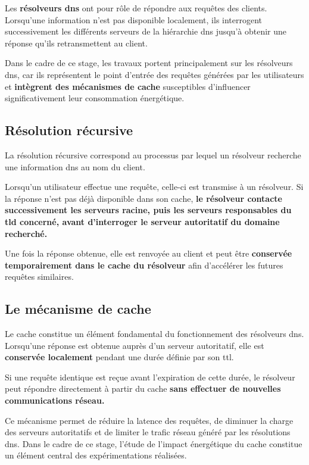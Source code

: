 \documentclass[12pt, a4paper]{report}
\begin{document}
	Les \textbf{résolveurs \gls{dns}} ont pour rôle de répondre aux requêtes des clients. Lorsqu'une information n'est pas disponible localement, ils interrogent successivement les différents serveurs de la hiérarchie \gls{dns} jusqu'à obtenir une réponse qu'ils retransmettent au client.

	Dans le cadre de ce stage, les travaux portent principalement sur les résolveurs \gls{dns}, car ils représentent le point d'entrée des requêtes générées par les utilisateurs et \textbf{intègrent des mécanismes de cache} susceptibles d'influencer significativement leur consommation énergétique.

	\subsection{Résolution récursive}

	La résolution récursive correspond au processus par lequel un résolveur recherche une information \gls{dns} au nom du client.

	Lorsqu'un utilisateur effectue une requête, celle-ci est transmise à un résolveur. Si la réponse n'est pas déjà disponible dans son cache, \textbf{le résolveur contacte successivement les serveurs racine, puis les serveurs responsables du \gls{tld} concerné, avant d'interroger le serveur autoritatif du domaine recherché.}

	Une fois la réponse obtenue, elle est renvoyée au client et peut être \textbf{conservée temporairement dans le cache du résolveur} afin d'accélérer les futures requêtes similaires.

	\subsection{Le mécanisme de cache}

	Le cache constitue un élément fondamental du fonctionnement des résolveurs \gls{dns}. Lorsqu'une réponse est obtenue auprès d'un serveur autoritatif, elle est \textbf{conservée localement} pendant une durée définie par son \gls{ttl}.

	Si une requête identique est reçue avant l'expiration de cette durée, le résolveur peut répondre directement à partir du cache \textbf{sans effectuer de nouvelles communications réseau.}

	Ce mécanisme permet de réduire la latence des requêtes, de diminuer la charge des serveurs autoritatifs et de limiter le trafic réseau généré par les résolutions \gls{dns}. Dans le cadre de ce stage, l'étude de l'impact énergétique du cache constitue un élément central des expérimentations réalisées.
\end{document}
